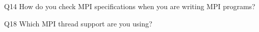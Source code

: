 \begin{description}%
\item{Q14} How do you check MPI specifications when you are writing MPI programs?%
\item{Q18} Which MPI thread support are you using?%
\end{description}%
